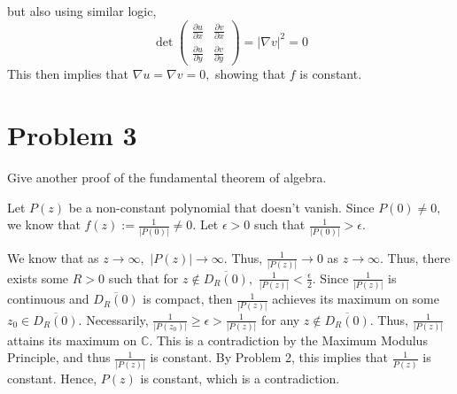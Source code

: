 \documentclass[11pt]{article}
\newcommand{\bbC}{\mathbb{C}}
\begin{document}
\begin{solution}
    but also using similar logic,
    \[\det \begin{pmatrix}
        \frac{\partial u}{\partial x} & \frac{\partial v}{\partial x}\\
        \frac{\partial u}{\partial y} & \frac{\partial v}{\partial y}
    \end{pmatrix}
    = |\nabla v|^2 = 0\]
This then implies that $\nabla u = \nabla v =0,$ showing that $f$ is constant.

\end{solution}


\newpage
\section*{Problem 3}
\begin{problem}
    Give another proof of the fundamental theorem of algebra. 
\end{problem}
\begin{solution}
    Let $P(z)$ be a non-constant polynomial that doesn't vanish. Since $P(0) \neq 0,$ we know that $f(z):= \frac{1}{|P(0)|} \neq 0.$ Let $\epsilon>0$ such that $\frac{1}{|P(0)|} >\epsilon.$
    
    We know that as $z\to \infty,$ $|P(z)| \to \infty.$ Thus, $\frac{1}{|P(z)|}\to 0$ as $z\to \infty.$ Thus, there exists some $R>0$ such that for $z\notin \overline{D_R(0)},$ $\frac{1}{|P(z)|} < \frac{\epsilon}{2}.$ Since $\frac{1}{{|P(z)|}}$ is continuous and $\overline{D_R(0)}$ is compact, then $\frac{1}{|P(z)|}$ achieves its maximum on some $z_0 \in \overline{D_R(0)}.$ Necessarily, $\frac{1}{|P(z_0)|} \geq\epsilon > \frac{1}{|P(z)|}$ for any $z\notin \overline{D_R(0)}.$ Thus, $\frac{1}{|P(z)|}$ attains its maximum on $\bbC.$ This is a contradiction by the Maximum Modulus Principle, and thus $\frac{1}{|P(z)|}$ is constant. By Problem 2, this implies that $\frac{1}{P(z)}$ is constant. Hence, $P(z)$ is constant, which is a contradiction. 
\end{solution}

\newpage
\end{document}
